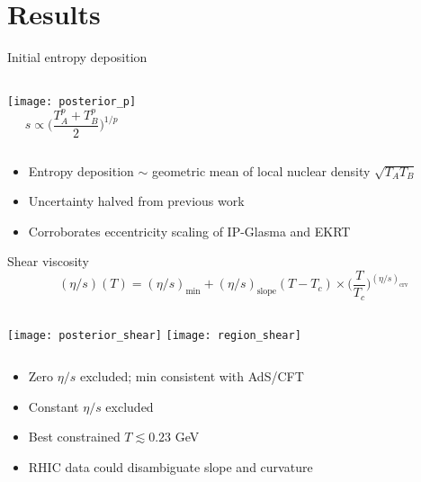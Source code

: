 \documentclass{beamer}
\newcommand{\es}{(\eta/s)}
\begin{document}
\section{Results}




\begin{frame}{Initial entropy deposition}
  \begin{columns}
    \texttt{[image: posterior\_p]}
    \begin{equation*}
      s \propto \Biggl( \frac{T_A^p + T_B^p}{2} \Biggr)^{1/p}
    \end{equation*}
  \end{columns}
  \medskip
  \begin{itemize}
    \setlength{\itemsep}{1ex}
    \item Entropy deposition $\sim$ geometric mean of local nuclear density $\sqrt{T_A T_B}$
    \item Uncertainty halved from previous work
    \item Corroborates eccentricity scaling of IP-Glasma and EKRT
  \end{itemize}
\end{frame}

\begin{frame}{Shear viscosity}
  \begin{equation*}
    \es(T) = \es_\text{min} + \es_\text{slope}(T - T_c) \times \biggl( \frac{T}{T_c} \biggr)^{\es_\text{crv}}
  \end{equation*}
  \begin{columns}
    \texttt{[image: posterior\_shear]}
    \texttt{[image: region\_shear]}
  \end{columns}
  \small
  \begin{itemize}
    \item Zero $\eta/s$ excluded; min consistent with AdS/CFT
    \item Constant $\eta/s$ excluded
    \item Best constrained $T \lesssim 0.23$ GeV
    \item RHIC data could disambiguate slope and curvature
  \end{itemize}
\end{frame}
\end{document}
